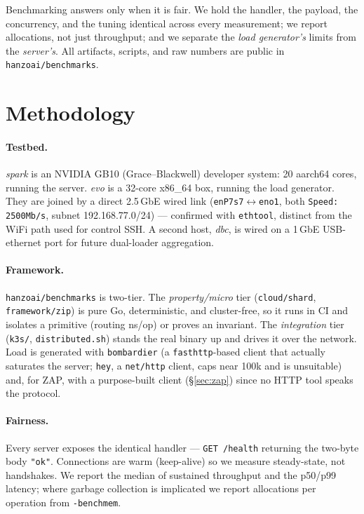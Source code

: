 \documentclass[11pt,twocolumn]{article}
\begin{document}
Benchmarking answers only when it is fair. We hold the handler, the payload, the
concurrency, and the tuning identical across every measurement; we report
allocations, not just throughput; and we separate the \emph{load generator's}
limits from the \emph{server's}. All artifacts, scripts, and raw numbers are
public in \texttt{hanzoai/benchmarks}.

\section{Methodology}
\paragraph{Testbed.} \emph{spark} is an NVIDIA GB10 (Grace--Blackwell) developer
system: 20 aarch64 cores, running the server. \emph{evo} is a 32-core x86\_64
box, running the load generator. They are joined by a direct 2.5\,GbE wired link
(\texttt{enP7s7}$\leftrightarrow$\texttt{eno1}, both \texttt{Speed: 2500Mb/s},
subnet 192.168.77.0/24) --- confirmed with \texttt{ethtool}, distinct from the
WiFi path used for control SSH. A second host, \emph{dbc}, is wired on a 1\,GbE
USB-ethernet port for future dual-loader aggregation.

\paragraph{Framework.} \texttt{hanzoai/benchmarks} is two-tier. The
\emph{property/micro} tier (\texttt{cloud/shard}, \texttt{framework/zip}) is pure
Go, deterministic, and cluster-free, so it runs in CI and isolates a primitive
(routing ns/op) or proves an invariant. The \emph{integration} tier
(\texttt{k3s/}, \texttt{distributed.sh}) stands the real binary up and drives it
over the network. Load is generated with \texttt{bombardier} (a
\texttt{fasthttp}-based client that actually saturates the server; \texttt{hey},
a \texttt{net/http} client, caps near 100k and is unsuitable) and, for ZAP, with
a purpose-built client (\S\ref{sec:zap}) since no HTTP tool speaks the protocol.

\paragraph{Fairness.} Every server exposes the identical handler --- \texttt{GET
/health} returning the two-byte body \texttt{"ok"}. Connections are warm
(keep-alive) so we measure steady-state, not handshakes. We report the median of
sustained throughput and the p50/p99 latency; where garbage collection is
implicated we report allocations per operation from \texttt{-benchmem}.
\end{document}
